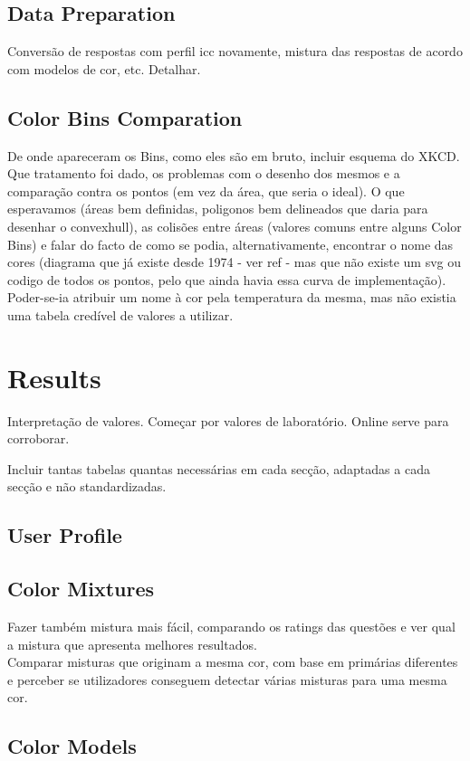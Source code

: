 \subsection{Data Preparation}
\label{subsec:results_preparation}
%
Conversão de respostas com perfil icc novamente, mistura das respostas de acordo com modelos de cor, etc.
Detalhar.
%
\subsection{Color Bins Comparation}
\label{subsec:results_preparation}
%
De onde apareceram os Bins, como eles são em bruto, incluir esquema do XKCD. Que tratamento foi dado, os problemas
com o desenho dos mesmos e a comparação contra os pontos (em vez da área, que seria o ideal). O que esperavamos
(áreas bem definidas, poligonos bem delineados que daria para desenhar o convexhull), as colisões entre áreas (valores
comuns entre alguns Color Bins) e falar do facto de como se podia, alternativamente, encontrar o nome das cores (diagrama
que já existe desde 1974 - ver ref - mas que não existe um svg ou codigo de todos os pontos, pelo que ainda havia essa curva
de implementação). Poder-se-ia atribuir um nome à cor pela temperatura da mesma, mas não existia uma tabela credível de valores
a utilizar.
%
\section{Results}
\label{sec:results_results}
%
Interpretação de valores. Começar por valores de laboratório. Online serve para corroborar. \par
Incluir tantas tabelas quantas necessárias em cada secção, adaptadas a cada secção e não standardizadas.
%
\subsection{User Profile}
\label{subsec:results_userprofile}
%
\subsection{Color Mixtures}
\label{subsec:results_colormixtures}
%
Fazer também mistura mais fácil, comparando os ratings das questões e ver qual a mistura que apresenta melhores resultados. \\
Comparar misturas que originam a mesma cor, com base em primárias diferentes e perceber se utilizadores conseguem detectar várias
misturas para uma mesma cor.
%
\subsection{Color Models}
\label{subsec:results_colormodels}
%

